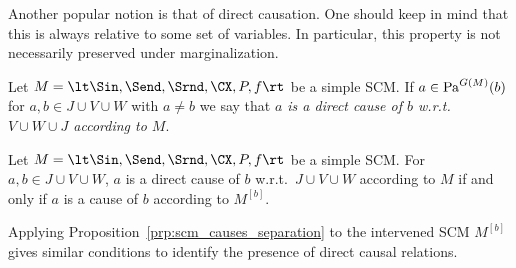 Another popular notion is that of direct causation. One should keep in mind that this is always relative to some set of variables.
In particular, this property is not necessarily preserved under marginalization.
\begin{Def}\label{def:direct_cause_of}
  Let $M = \lt \Sin, \Send, \Srnd, \CX, P, f \rt$ be a simple SCM.
  If $a \in \mathrm{Pa}^{G(M)}(b)$ for $a, b \in J \cup V \cup W$ with $a\ne b$ we say that \emph{$a$ is a direct cause of $b$ w.r.t.\ $V \cup W \cup J$ according to $M$}.
\end{Def}
\begin{Prp}\label{prp:direct_cause_of}
  Let $M = \lt \Sin, \Send, \Srnd, \CX, P, f \rt$ be a simple SCM.
  For $a,b \in J \cup V \cup W$, $a$ is a direct cause of $b$ w.r.t.\ $J \cup V \cup W$ according to $M$ if and only if $a$ is a cause of $b$ according to $M^{[b]}$.
\end{Prp}
Applying Proposition~\ref{prp:scm_causes_separation} to the intervened SCM $M^{[b]}$
gives similar conditions to identify the presence of direct causal relations.
%
